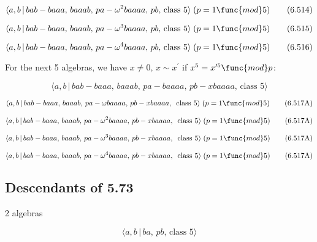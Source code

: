 \documentclass[10pt]{article}
\begin{document}
\begin{equation}
\langle a,b\,|\,bab-baaa,\,baaab,\,pa-\omega ^2baaaa,\,pb,\,\text{class }%
5\rangle\;(p=1 \func{mod} 5)  \tag{6.514}
\end{equation}

\begin{equation}
\langle a,b\,|\,bab-baaa,\,baaab,\,pa-\omega ^3baaaa,\,pb,\,\text{class }%
5\rangle\;(p=1 \func{mod} 5)  \tag{6.515}
\end{equation}

\begin{equation}
\langle a,b\,|\,bab-baaa,\,baaab,\,pa-\omega ^{4}baaaa,\,pb,\,\text{class }%
5\rangle \;(p=1\func{mod}5)  \tag{6.516}
\end{equation}

For the next 5 algebras, we have $x\neq 0,\,x\sim x^{\prime }$ if $%
x^{5}=x^{\prime 5}\func{mod}p$:

\begin{equation}
\langle a,b\,|\,bab-baaa,\,baaab,\,pa-baaaa,\,pb-xbaaaa,\,\text{class }%
5\rangle  \tag{6.517}
\end{equation}

\begin{equation}
\langle a,b\,|\,bab-baaa,\,baaab,\,pa-\omega baaaa,\,pb-xbaaaa,\,\text{
class }5\rangle \;(p=1\func{mod}5)  \tag{6.517A}
\end{equation}

\begin{equation}
\langle a,b\,|\,bab-baaa,\,baaab,\,pa-\omega ^{2}baaaa,\,pb-xbaaaa,\,\text{
class }5\rangle \;(p=1\func{mod}5)  \tag{6.517A}
\end{equation}

\begin{equation}
\langle a,b\,|\,bab-baaa,\,baaab,\,pa-\omega ^{3}baaaa,\,pb-xbaaaa,\,\text{
class }5\rangle \;(p=1\func{mod}5)  \tag{6.517A}
\end{equation}

\begin{equation}
\langle a,b\,|\,bab-baaa,\,baaab,\,pa-\omega ^{4}baaaa,\,pb-xbaaaa,\,\text{
class }5\rangle \;(p=1\func{mod}5)  \tag{6.517A}
\end{equation}

\subsection{Descendants of 5.73}

2 algebras

\begin{equation}
\langle a,b\,|\,ba,\,pb,\,\text{class }5\rangle  \tag{6.518}
\end{equation}
\end{document}
